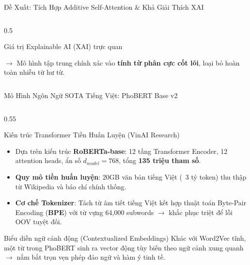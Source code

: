 \documentclass[aspectratio=169, 10pt]{beamer}
\begin{document}
\begin{frame}{Đề Xuất: Tích Hợp Additive Self-Attention \& Khả Giải Thích XAI}
\begin{columns}[c]
\begin{column}{0.5\textwidth}
\begin{exampleblock}{Giá trị Explainable AI (XAI) trực quan}
        \vspace{0.15cm}
        \raggedright
        $\to$ Mô hình tập trung chính xác vào \textbf{tính từ phân cực cốt lõi}, loại bỏ hoàn toàn nhiễu từ hư từ.
      \end{exampleblock}
    \end{column}
  \end{columns}
\end{frame}

\begin{frame}{Mô Hình Ngôn Ngữ SOTA Tiếng Việt: PhoBERT Base v2}
  \begin{columns}[c]
    \begin{column}{0.55\textwidth}
      \begin{block}{Kiến trúc Transformer Tiền Huấn Luyện (VinAI Research)}
        \fontsize{7.5}{9.5}\selectfont
        \begin{itemize}
          \item Dựa trên kiến trúc \textbf{RoBERTa-base}: 12 tầng Transformer Encoder, 12 attention heads, ẩn số $d_{model} = 768$, tổng \textbf{135 triệu tham số}.
          \item \textbf{Quy mô tiền huấn luyện}: 20GB văn bản tiếng Việt (~3 tỷ token) thu thập từ Wikipedia và báo chí chính thống.
          \item \textbf{Cơ chế Tokenizer}: Tách từ âm tiết tiếng Việt kết hợp thuật toán Byte-Pair Encoding (\textbf{BPE}) với từ vựng 64,000 subwords $\to$ khắc phục triệt để lỗi OOV tuyệt đối.
        \end{itemize}
      \end{block}
      \begin{exampleblock}{Biểu diễn ngữ cảnh động (Contextualized Embeddings)}
        \fontsize{7.5}{9.5}\selectfont
        Khác với Word2Vec tĩnh, một từ trong PhoBERT sinh ra vector động tùy biến theo ngữ cảnh xung quanh $\to$ nắm bắt trọn vẹn phép đảo ngữ và hàm ý tinh tế.
      \end{exampleblock}
    \end{column}


\end{columns}
\end{frame}
\end{document}
